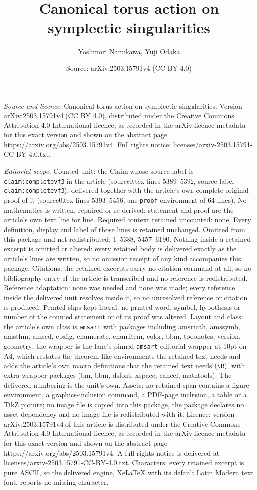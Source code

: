 \documentclass[10pt,a4paper]{amsart}
\title[Canonical torus action on symplectic singularities]{Canonical torus action on symplectic singularities}
\author{Yoshinori Namikawa, Yuji Odaka}
\date{Source: arXiv:2503.15791v4 (CC BY 4.0)}
\begin{document}
\maketitle

\noindent\emph{Source and licence.} Canonical torus action on symplectic singularities. Version arXiv:2503.15791v4 (CC BY 4.0), distributed under the Creative Commons Attribution 4.0 International licence, as recorded in the arXiv licence metadata for this exact version and shown on the abstract page https://arxiv.org/abs/2503.15791v4. Full rights notice: licenses/arxiv-2503.15791-CC-BY-4.0.txt.\par\smallskip

\noindent\textit{Editorial scope.} Counted unit: the Claim whose source label is \texttt{claim:completevf3} in the article (source0.tex lines 5389--5392, source label \texttt{claim:completevf3}), delivered together with the article's own complete original proof of it (source0.tex lines 5393--5456, one \texttt{proof} environment of 64 lines). No mathematics is written, repaired or re-derived: statement and proof are the article's own text line for line. Required context retained uncounted: none. Every definition, display and label of those lines is retained unchanged. Omitted from this package and not redistributed: 1--5388, 5457--6190. Nothing inside a retained excerpt is omitted or altered: every retained body is delivered exactly as the article's lines are written, so no omission receipt of any kind accompanies this package. Citations: the retained excerpts carry no citation command at all, so no bibliography entry of the article is transcribed and no reference is redistributed. Reference adaptation: none was needed and none was made; every reference inside the delivered unit resolves inside it, so no unresolved reference or citation is produced. Printed slips kept literal: no printed word, symbol, hypothesis or number of the counted statement or of its proof was altered. Layout and class: the article's own class is \texttt{amsart} with packages including amsmath, amssymb, amsthm, amscd, epsfig, enumerate, enumitem, color, bbm, todonotes, version, geometry; the wrapper is the lane's pinned \texttt{amsart} editorial wrapper at 10pt on A4, which restates the theorem-like environments the retained text needs and adds the article's own macro definitions that the retained text needs (\texttt{\textbackslash R}), with extra wrapper packages (bm, bbm, dsfont, xspace, cancel, mathtools). The delivered numbering is the unit's own. Assets: no retained span contains a figure environment, a graphics-inclusion command, a PDF-page inclusion, a table or a TikZ picture; no image file is copied into this package, the package declares no asset dependency and no image file is redistributed with it. Licence: version arXiv:2503.15791v4 of this article is distributed under the Creative Commons Attribution 4.0 International licence, as recorded in the arXiv licence metadata for this exact version and shown on the abstract page https://arxiv.org/abs/2503.15791v4. A full rights notice is delivered at licenses/arxiv-2503.15791-CC-BY-4.0.txt. Characters: every retained excerpt is pure ASCII, so the delivered engine, XeLaTeX with its default Latin Modern text font, reports no missing character.
\end{document}
